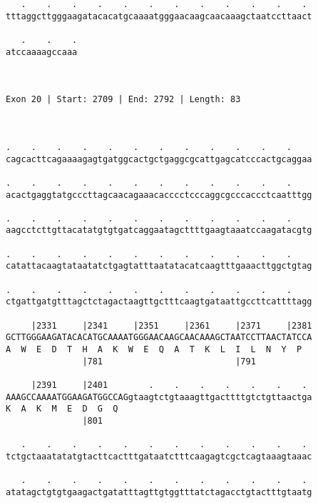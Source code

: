 \documentclass{article}
\begin{document}
\begin{Verbatim}
   .    .    .    .    .    .    .    .    .    .    .    . 
tttaggcttgggaagatacacatgcaaaatgggaacaagcaacaaagctaatccttaact
                                                            
   .    .    .
atccaaaagccaaa
              
              
 
Exon 20 | Start: 2709 | End: 2792 | Length: 83



.    .    .    .    .    .    .    .    .    .    .    .    
cagcacttcagaaaagagtgatggcactgctgaggcgcattgagcatcccactgcaggaa
                                                            
.    .    .    .    .    .    .    .    .    .    .    .    
acactgaggtatgcccttagcaacagaaacacccctcccaggcgcccaccctcaatttgg
                                                            
.    .    .    .    .    .    .    .    .    .    .    .    
aagcctcttgttacatatgtgtgatcaggaatagcttttgaagtaaatccaagatacgtg
                                                            
.    .    .    .    .    .    .    .    .    .    .    .    
catattacaagtataatatctgagtatttaatatacatcaagtttgaaacttggctgtag
                                                            
.    .    .    .    .    .    .    .    .    .    .    .    
ctgattgatgtttagctctagactaagttgctttcaagtgataattgccttcattttagg
                                                            
     |2331     |2341     |2351     |2361     |2371     |2381
GCTTGGGAAGATACACATGCAAAATGGGAACAAGCAACAAAGCTAATCCTTAACTATCCA
A  W  E  D  T  H  A  K  W  E  Q  A  T  K  L  I  L  N  Y  P  
               |781                          |791           
  
     |2391     |2401        .    .    .    .    .    .    . 
AAAGCCAAAATGGAAGATGGCCAGgtaagtctgtaaagttgacttttgtctgttaactga
K  A  K  M  E  D  G  Q                                      
               |801                                         
  
   .    .    .    .    .    .    .    .    .    .    .    . 
tctgctaaatatatgtacttcactttgataatctttcaagagtcgctcagtaaagtaaac
                                                            
   .    .    .    .    .    .    .    .    .    .    .    . 
atatagctgtgtgaagactgatatttagttgtggtttatctagacctgtactttgtaatg
                                                            

\end{Verbatim}
\end{document}
